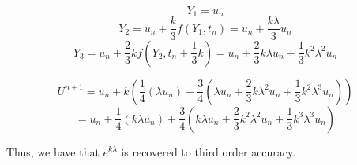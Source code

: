 \begin{solution}
    $$Y_1=u_n$$
    $$Y_2=u_n+\frac{k}{3}f(Y_1,t_n)=u_n+\frac{k\lambda}{3}u_n$$
    $$Y_3=u_n+\frac23kf(Y_2,t_n+\frac13k)=u_n+\frac23k\lambda u_n+\frac13k^2\lambda^2u_n$$

    $$U^{n+1}=
    u_n+k(\frac14(\lambda u_n)+\frac34(\lambda u_n+\frac23k\lambda^2u_n+\frac13k^2\lambda^3u_n))$$
    $$=u_n+\frac14(k\lambda u_n)+\frac34(k\lambda u_n+\frac23k^2\lambda^2u_n+\frac13k^3\lambda^3u_n)$$

    Thus, we have that $e^{k\lambda}$ is recovered to third order accuracy.

\end{solution}